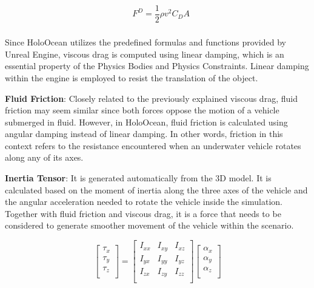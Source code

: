 \documentclass[]{article}
\begin{document}
	\begin{equation}
		\begin{aligned}
			& F^{D} = \dfrac{1}{2} \rho v^{2}C_{D}A \\		
		\end{aligned}
	\end{equation}
	
	Since HoloOcean utilizes the predefined formulas and functions provided by Unreal Engine, viscous drag is computed using linear damping, which is an essential property of the Physics Bodies and Physics Constraints. Linear damping within the engine is employed to resist the translation of the object.
	
	\textbf{Fluid Friction}: Closely related to the previously explained viscous drag, fluid friction may seem similar since both forces oppose the motion of a vehicle submerged in fluid. However, in HoloOcean, fluid friction is calculated using angular damping instead of linear damping. In other words, friction in this context refers to the resistance encountered when an underwater vehicle rotates along any of its axes.
	
	\textbf{Inertia Tensor}: It is generated automatically from the 3D model. It is calculated based on the moment of inertia along the three axes of the vehicle and the angular acceleration needed to rotate the vehicle inside the simulation. Together with fluid friction and viscous drag, it is a force that needs to be considered to generate smoother movement of the vehicle within the scenario.
	
	\begin{equation}
		\begin{bmatrix}
			\tau_{x} \\
			\tau_{y} \\
			\tau_{z} \\
		\end{bmatrix} = \begin{bmatrix}
			I_{xx} & I_{xy} & I_{xz} \\
			I_{yx} & I_{yy} & I_{yz} \\
			I_{zx} & I_{zy} & I_{zz} \\
		\end{bmatrix} \begin{bmatrix}
			\alpha_{x} \\
			\alpha_{y} \\
			\alpha_{z} \\
		\end{bmatrix}		
	\end{equation}
\end{document}
